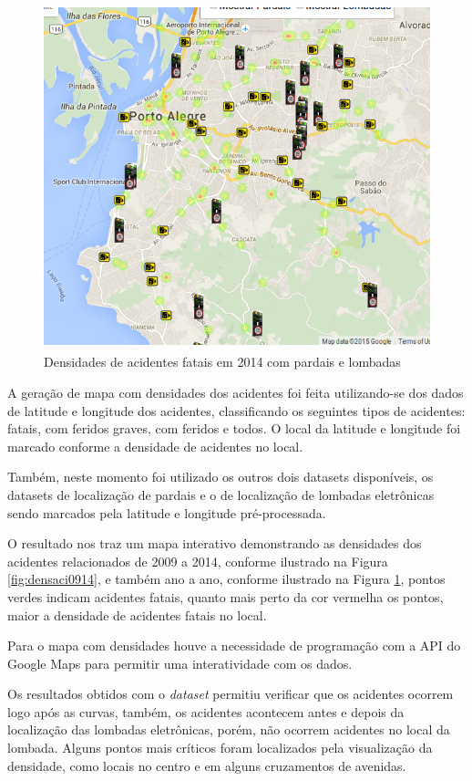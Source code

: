 \documentclass[11pt,article,oneside,a4paper]{abntex2}
\begin{document}
\begin{figure}[h!]
	\caption{Densidades de acidentes fatais em 2014 com pardais e lombadas} \label{fig:densaci}
	\centering
	\includegraphics[width=.8\textwidth]{densidade_acidentes_2014.jpg}
\end{figure}

A geração de mapa com densidades dos acidentes foi feita utilizando-se dos dados de latitude e longitude dos acidentes, classificando os seguintes tipos de acidentes: fatais, com feridos graves, com feridos e todos. O local da latitude e longitude foi marcado conforme a densidade de acidentes no local. 

Também, neste momento foi utilizado os outros dois datasets disponíveis, os datasets de localização de pardais e o de localização de lombadas eletrônicas sendo marcados pela latitude e longitude pré-processada. 

O resultado nos traz um mapa interativo demonstrando as densidades dos acidentes relacionados de 2009 a 2014, conforme ilustrado na Figura \ref{fig:densaci0914}, e também ano a ano, conforme ilustrado na Figura \ref{fig:densaci}, pontos verdes indicam acidentes fatais, quanto mais perto da cor vermelha os pontos, maior a densidade de acidentes fatais no local.

Para o mapa com densidades houve a necessidade de programação com a API do Google Maps para permitir uma interatividade com os dados.

Os resultados obtidos com o \textit{dataset} permitiu verificar que os acidentes ocorrem logo após as curvas, também, os acidentes acontecem antes e depois da localização das lombadas eletrônicas, porém, não ocorrem acidentes no local da lombada. Alguns pontos mais críticos foram localizados pela visualização da densidade, como locais no centro e em alguns cruzamentos de avenidas.
\end{document}
